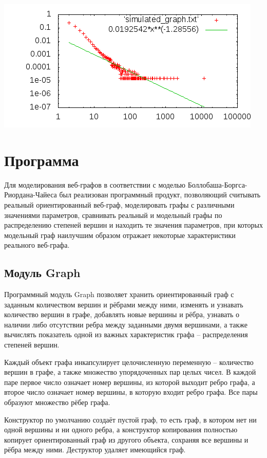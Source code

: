 \documentclass[14pt]{extreport}
\begin{document}
\includegraphics{code/simulated_graph.png}

\chapter{Программа}

Для моделирования веб-графов в соответствии с моделью Боллобаша-Боргса-Риордана-Чайеса был реализован программный продукт, позволяющий считывать реальный ориентированный веб-граф, моделировать графы с различными значениями параметров, сравнивать реальный и модельный графы по распределению степеней вершин и находить те значения параметров, при которых модельный граф наилучшим образом отражает некоторые характеристики реального веб-графа.

\section{Модуль Graph}

Программный модуль Graph позволяет хранить ориентированный граф с заданным количеством вершин и рёбрами между ними, изменять и узнавать количество вершин в графе, добавлять новые вершины и рёбра, узнавать о наличии либо отсутствии ребра между заданными двумя вершинами, а также вычислять показатель одной из важных характеристик графа -- распределения степеней вершин.

Каждый объект графа инкапсулирует целочисленную переменную -- количество вершин в графе, а также множество упорядоченных пар целых чисел. В каждой паре первое число означает номер вершины, из которой выходит ребро графа, а второе число означает номер вершины, в которую входит ребро графа. Все пары образуют множество рёбер графа.

Конструктор по умолчанию создаёт пустой граф, то есть граф, в котором нет ни одной вершины и ни одного ребра, а конструктор копирования полностью копирует ориентированный граф из другого объекта, сохраняя все вершины и рёбра между ними. Деструктор удаляет имеющийся граф.
\end{document}
